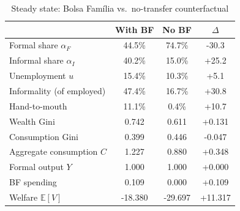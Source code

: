 \begin{table}[htbp]\centering
\caption{Steady state: Bolsa Fam\'ilia vs.\ no-transfer counterfactual}
\label{tab:bf_ss}
\begin{tabular}{lccc}
\toprule
 & With BF & No BF & $\Delta$ \\
\midrule
Formal share $\alpha_F$ & 44.5\% & 74.7\% & -30.3 \\
Informal share $\alpha_I$ & 40.2\% & 15.0\% & +25.2 \\
Unemployment $u$ & 15.4\% & 10.3\% & +5.1 \\
Informality (of employed) & 47.4\% & 16.7\% & +30.8 \\
Hand-to-mouth & 11.1\% & 0.4\% & +10.7 \\
Wealth Gini & 0.742 & 0.611 & +0.131 \\
Consumption Gini & 0.399 & 0.446 & -0.047 \\
Aggregate consumption $C$ & 1.227 & 0.880 & +0.348 \\
Formal output $Y$ & 1.000 & 1.000 & +0.000 \\
BF spending & 0.109 & 0.000 & +0.109 \\
Welfare $\mathbb{E}[V]$ & -18.380 & -29.697 & +11.317 \\
\bottomrule
\end{tabular}
\end{table}
